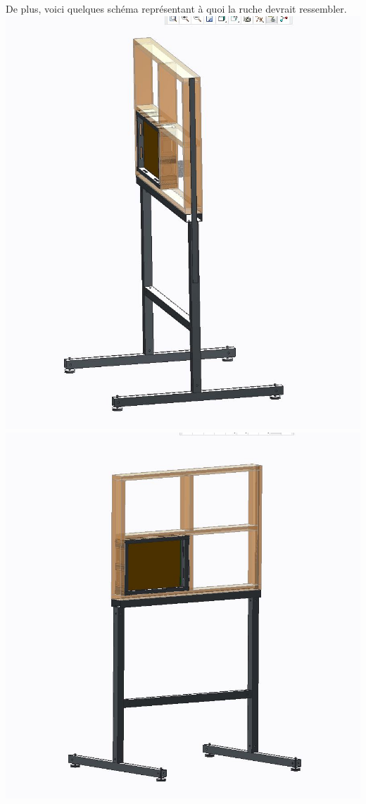 \documentclass[11pt,french,a4paper]{report}
\begin{document}
De plus, voici quelques schéma représentant à quoi la ruche devrait ressembler.
\includegraphics[scale=0.3]{../images/schema_ruche/supportrucheplate1.JPG}
\includegraphics[scale=0.3]{../images/schema_ruche/supportrucheplate.JPG} \\
\end{document}
